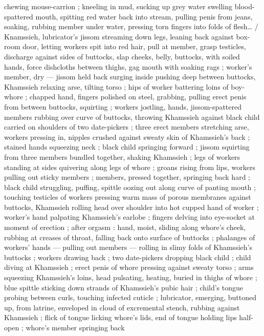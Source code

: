 chewing %
mouse-carrion ; kneeling in mud, sucking up grey water swelling 
blood-spattered mouth, spitting red water back into stream, pulling 
penis from jeans, soaking, rubbing member under water, pressing 
torn fingers into folds of flesh{\ldots} {\slash} Knamssieh, lubricator's jissom 
streaming down legs, leaning back against box-room door, letting 
workers spit into red hair, pull at member, grasp testicles, discharge 
against sides of buttocks, slap cheeks, belly, buttocks, with soiled 
hands, force dishcloths between thighs, gag mouth with soaking rags 
; worker's member, dry --- jissom held back surging inside {\dashcom}
pushing deep between buttocks, Khamssieh relaxing arse, tilting 
torso ; hips of worker battering loins of boy-whore ; chapped hand, 
fingers polished on steel, grabbing, pulling erect penis from between 
buttocks, squirting ; workers jostling, hands, jissom-spattered 
members rubbing over curve of buttocks, throwing Khamssieh 
against black child carried on shoulders of two date-pickers ; three 
erect members stretching arse, workers pressing in, nipples crushed 
against sweaty skin of Khamssieh's back ; stained hands squeezing 
neck ; black child springing forward ; jissom squirting from three 
members bundled together, shaking Khamssieh ; legs of workers 
standing at sides quivering along legs of whore ; groans rising from 
lips, workers pulling out sticky members ; members, pressed 
together, springing back hard ; black child struggling, puffing, spittle 
oozing out along curve of panting mouth ; touching testicles of 
workers pressing warm mass of porous membranes against buttocks, 
Khamssieh rolling head over shoulder into hot cupped hand of 
worker ; worker's hand palpating Khamssieh's earlobe ; fingers 
delving into eye-socket at moment of erection ; after orgasm : hand, 
moist, sliding along whore's cheek, rubbing at creases of throat, 
falling back onto surface of buttocks ; phalanges of workers' hands 
--- pulling out members --- rolling in slimy folds of Khamssieh's 
buttocks ; workers drawing back ; two date-pickers dropping black 
child ; child diving at Khamssieh ; erect penis of whore pressing 
against sweaty torso ; arms squeezing Khamssieh's loins, head 
pulsating, heating, buried in thighs of whore ; blue spittle sticking 
down strands of Khamssieh's pubic hair ; child's tongue probing 
between curls, touching infected cuticle ; lubricator, emerging, 
buttoned up, from latrine, enveloped in cloud of excremental stench, 
rubbing against Khamssieh ; flick of tongue licking whore's lids, end 
of tongue holding lips half-open ; whore's member springing back 
